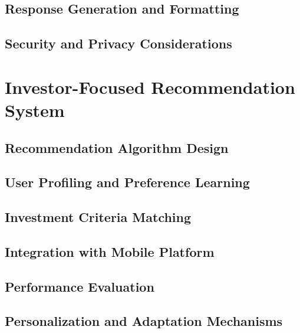 \subsection{Response Generation and Formatting}
\subsection{Security and Privacy Considerations}

\section{Investor-Focused Recommendation System}
\subsection{Recommendation Algorithm Design}
\subsection{User Profiling and Preference Learning}
\subsection{Investment Criteria Matching}
\subsection{Integration with Mobile Platform}
\subsection{Performance Evaluation}
\subsection{Personalization and Adaptation Mechanisms}





